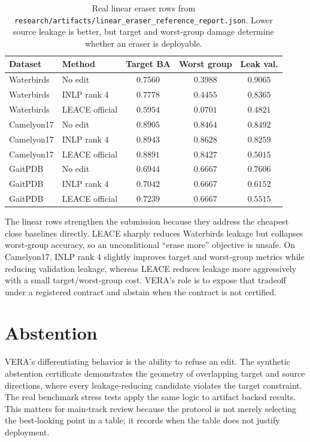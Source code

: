 \documentclass[10pt]{article}
\begin{document}
\begin{table}[t]
\centering
\small
\begin{tabular}{@{}llccc@{}}
\toprule
Dataset & Method & Target BA & Worst group & Leak val. \\
\midrule
Waterbirds & No edit & $0.7560$ & $0.3988$ & $0.9065$ \\
Waterbirds & INLP rank 4 & $0.7778$ & $0.4455$ & $0.8365$ \\
Waterbirds & LEACE official & $0.5954$ & $0.0701$ & $0.4821$ \\
Camelyon17 & No edit & $0.8905$ & $0.8464$ & $0.8492$ \\
Camelyon17 & INLP rank 4 & $0.8943$ & $0.8628$ & $0.8259$ \\
Camelyon17 & LEACE official & $0.8891$ & $0.8427$ & $0.5015$ \\
GaitPDB & No edit & $0.6944$ & $0.6667$ & $0.7606$ \\
GaitPDB & INLP rank 4 & $0.7042$ & $0.6667$ & $0.6152$ \\
GaitPDB & LEACE official & $0.7239$ & $0.6667$ & $0.5515$ \\
\bottomrule
\end{tabular}
\caption{Real linear eraser rows from
\texttt{research/artifacts/linear\_eraser\_reference\_report.json}. Lower
source leakage is better, but target and worst-group damage determine whether
an eraser is deployable.}
\label{tab:linear-erasers}
\end{table}

The linear rows strengthen the submission because they address the cheapest
close baselines directly. LEACE sharply reduces Waterbirds leakage but
collapses worst-group accuracy, so an unconditional ``erase more'' objective is
unsafe. On Camelyon17, INLP rank 4 slightly improves target and worst-group
metrics while reducing validation leakage, whereas LEACE reduces leakage more
aggressively with a small target/worst-group cost. VERA's role is to expose
that tradeoff under a registered contract and abstain when the contract is not
certified.

\section{Abstention}

VERA's differentiating behavior is the ability to refuse an edit. The synthetic
abstention certificate demonstrates the geometry of overlapping target and
source directions, where every leakage-reducing candidate violates the target
constraint. The real benchmark stress tests apply the same logic to artifact
backed results. This matters for main-track review because the protocol is not
merely selecting the best-looking point in a table; it records when the table
does not justify deployment.
\end{document}
